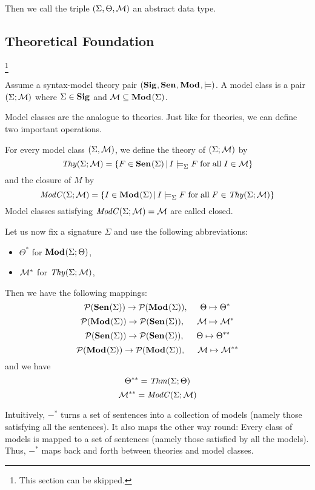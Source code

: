 Then we call the triple $(\Sigma,\Theta,{\cal M})$ an abstract data type.

\subsection{Theoretical Foundation}

\footnote{This section can be skipped.}

\begin{definition}
Assume a syntax-model theory pair $({\mathbf{Sig}^{}},{\mathbf{Sen}^{}},{\mathbf{Mod}^{}},\models)$. A model class is a pair $(\Sigma;{\cal M})$ where $\Sigma\in{\mathbf{Sig}^{}}$ and ${\cal M}\subseteq{\mathbf{Mod}^{}}(\Sigma)$.
\end{definition}

Model classes are the analogue to theories. Just like for theories, we can define two important operations.

\begin{definition}
For every model class $(\Sigma,{\cal M})$, we define the theory of $(\Sigma;{\cal M})$ by
\[\mathit{Thy}(\Sigma;{\cal M})=\{F\in{\mathbf{Sen}^{}}(\Sigma)\,|\, I\models^{}_{\Sigma}F \;\mathrm{for}\;\mathrm{all}\; I\in {\cal M}\}\]
and the closure of $M$ by
\[\mathit{ModC}(\Sigma;{\cal M})=\{I\in{\mathbf{Mod}^{}}(\Sigma)\,|\, I\models^{}_{\Sigma}F \;\mathrm{for}\;\mathrm{all}\; F\in \mathit{Thy}(\Sigma;{\cal M})\}\]
Model classes satisfying $\mathit{ModC}(\Sigma;{\cal M})={\cal M}$ are called closed.
\end{definition}

\begin{notation}
Let us now fix a signature $\Sigma$ and use the following abbreviations:
\begin{itemize}
 \item $\Theta^*$ for ${\mathbf{Mod}^{}}(\Sigma;\Theta)$,
 \item ${\cal M}^*$ for $\mathit{Thy}(\Sigma;{\cal M})$,
\end{itemize}
\end{notation}

Then we have the following mappings:
\[\mathcal{P}({\mathbf{Sen}^{}}(\Sigma)) \rightarrow  \mathcal{P}({\mathbf{Mod}^{}}(\Sigma)), \hspace*{.5cm} \Theta\mapsto \Theta^* \]
\[\mathcal{P}({\mathbf{Mod}^{}}(\Sigma)) \rightarrow  \mathcal{P}({\mathbf{Sen}^{}}(\Sigma)), \hspace*{.5cm} {\cal M}\mapsto{\cal M}^* \]
\[\mathcal{P}({\mathbf{Sen}^{}}(\Sigma)) \rightarrow  \mathcal{P}({\mathbf{Sen}^{}}(\Sigma)), \hspace*{.5cm} \Theta\mapsto \Theta^{**} \]
\[\mathcal{P}({\mathbf{Mod}^{}}(\Sigma)) \rightarrow  \mathcal{P}({\mathbf{Mod}^{}}(\Sigma)), \hspace*{.5cm} {\cal M} \mapsto {\cal M}^{**} \]
and we have
\[\Theta^{**}=\mathit{Thm}(\Sigma;\Theta)\]
\[{\cal M}^{**}=\mathit{ModC}(\Sigma;{\cal M})\]

Intuitively, $-^*$ turns a set of sentences into a collection of models (namely those satisfying all the sentences). It also maps the other way round: Every class of models is mapped to a set of sentences (namely those satisfied by all the models). Thus, $-^*$ maps back and forth between theories and model classes.

